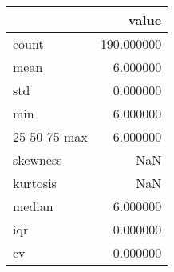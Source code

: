 \begin{tabular}{lr}
\toprule
 & value \\
\midrule
count & 190.000000 \\
mean & 6.000000 \\
std & 0.000000 \\
min & 6.000000 \\
25%
50%
75%
max & 6.000000 \\
skewness & NaN \\
kurtosis & NaN \\
median & 6.000000 \\
iqr & 0.000000 \\
cv & 0.000000 \\
\bottomrule
\end{tabular}
